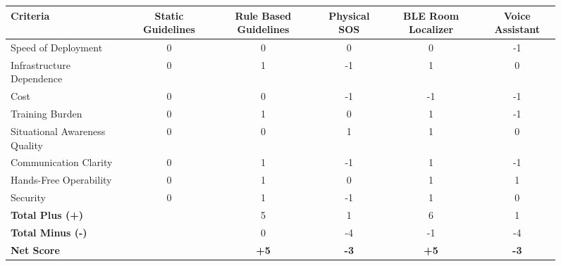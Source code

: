 \documentclass[english,12pt,a4paper,titlepage]{article}
\begin{document}
	\begin{figure}[H]
		\begin{minipage}{\textwidth}
			\centering
			\label{Select Phase - Emergency Coordination Pugh Chart}
		\end{minipage}
		\centering
		\begin{adjustbox}{max width=\textwidth}
			\begin{tabular}{l c c c c c}
				\toprule
				\textbf{Criteria} & \textbf{Static Guidelines} & \textbf{Rule Based Guidelines} & \textbf{Physical SOS} & \textbf{BLE Room Localizer} & \textbf{Voice Assistant} \\
				\midrule
				Speed of Deployment & 0 & 0 & 0 & 0 & \cellcolor{red!25}-1 \\
				Infrastructure Dependence & 0 & \cellcolor{green!25}1 & \cellcolor{red!25}-1 & \cellcolor{green!25}1 & 0 \\
				Cost & 0 & 0 & \cellcolor{red!25}-1 & \cellcolor{red!25}-1 & \cellcolor{red!25}-1 \\
				Training Burden & 0 & \cellcolor{green!25}1 & 0 & \cellcolor{green!25}1 & \cellcolor{red!25}-1 \\
				Situational Awareness Quality & 0 & 0 & \cellcolor{green!25}1 & \cellcolor{green!25}1 & 0 \\
				Communication Clarity & 0 & \cellcolor{green!25}1 & \cellcolor{red!25}-1 & \cellcolor{green!25}1 & \cellcolor{red!25}-1 \\
				Hands-Free Operability & 0 & \cellcolor{green!25}1 & 0 & \cellcolor{green!25}1 & \cellcolor{green!25}1 \\
				Security & 0 & \cellcolor{green!25}1 & \cellcolor{red!25}-1 & \cellcolor{green!25}1 & 0 \\
				\midrule
				\textbf{Total Plus (+)} & & 5 & 1 & 6 & 1 \\
				\textbf{Total Minus (-)} & & 0 & -4 & -1 & -4 \\
				\midrule
				\textbf{Net Score} & & \textbf{+5} & \textbf{-3} & \textbf{+5} & \textbf{-3} \\
				\bottomrule
			\end{tabular}
		\end{adjustbox}
	\end{figure}
	
\end{document}
